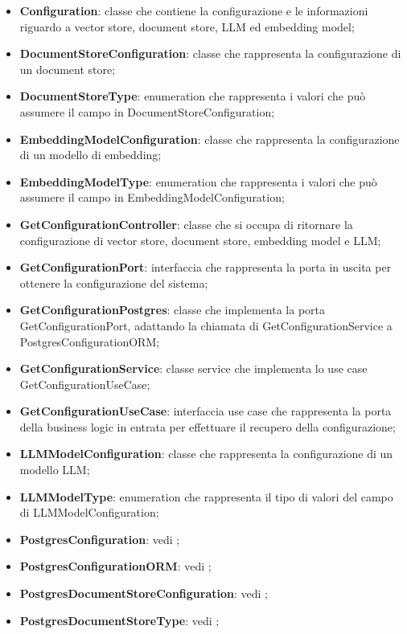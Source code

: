 \documentclass[10pt, a4paper]{article}
\begin{document}
\begin{itemize}

    \item \label{Configuration}\textbf{Configuration}: classe che contiene la configurazione e le informazioni riguardo a vector store, document store, LLM ed embedding model;
    \item \label{DocumentStoreConfiguration}\textbf{DocumentStoreConfiguration}: classe che rappresenta la configurazione di un document store;
    \item \label{DocumentStoreType}\textbf{DocumentStoreType}:  enumeration che rappresenta i valori che può assumere il campo  in DocumentStoreConfiguration;
    \item \label{EmbeddingModelConfiguration}\textbf{EmbeddingModelConfiguration}: classe che rappresenta la configurazione di un modello di embedding;
    \item \label{EmbeddingModelType}\textbf{EmbeddingModelType}: enumeration che rappresenta i valori che può assumere il campo  in EmbeddingModelConfiguration;
    \item \label{GetConfigurationController}\textbf{GetConfigurationController}: classe che si occupa di ritornare la configurazione di vector store, document store, embedding model e LLM;
    \item \label{GetConfigurationPort}\textbf{GetConfigurationPort}: interfaccia che rappresenta la porta in uscita per ottenere la configurazione del sistema;
    \item \label{GetConfigurationPostgres}\textbf{GetConfigurationPostgres}: classe che implementa la porta GetConfigurationPort, adattando la chiamata di GetConfigurationService a PostgresConfigurationORM;
    \item \label{GetConfigurationService}\textbf{GetConfigurationService}: classe service che implementa lo use case GetConfigurationUseCase;
    \item \label{GetConfigurationUseCase}\textbf{GetConfigurationUseCase}: interfaccia use case che rappresenta la porta della business logic in entrata per effettuare il recupero della configurazione; 
    
    \item \label{LLMModelConfiguration}\textbf{LLMModelConfiguration}: classe che rappresenta la configurazione di un modello LLM;
    \item \label{LLMModelType}\textbf{LLMModelType}: enumeration che rappresenta il tipo di valori del campo  di LLMModelConfiguration;
    \item \textbf{PostgresConfiguration}: vedi ;
    \item \textbf{PostgresConfigurationORM}: vedi ;
    \item \textbf{PostgresDocumentStoreConfiguration}: vedi ;
    \item \textbf{PostgresDocumentStoreType}: vedi ;


\end{itemize}
\end{document}
